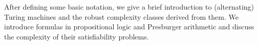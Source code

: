 \documentclass[../../diss.tex]{subfiles}
\begin{document}
After defining some basic notation, we give a brief introduction to (alternating) Turing machines and the robust complexity classes derived from them.
We introduce formulas in propositional logic and Presburger arithmetic and discuss the complexity of their satisfiability problems.
\end{document}
